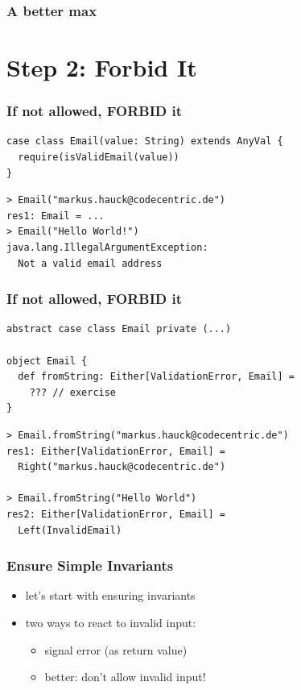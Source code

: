 \documentclass{beamer}
\begin{document}
\begin{frame}
  \frametitle{A better max}
  
\end{frame}

\section{Step 2: Forbid It}

\begin{frame}[fragile]
  \frametitle{If not allowed, FORBID it}
\begin{verbatim}
case class Email(value: String) extends AnyVal {
  require(isValidEmail(value))
}
\end{verbatim}
\begin{verbatim}
> Email("markus.hauck@codecentric.de")
res1: Email = ...
> Email("Hello World!")
java.lang.IllegalArgumentException: 
  Not a valid email address                      
\end{verbatim}
\end{frame}

\begin{frame}
  \frametitle{If not allowed, FORBID it}
\begin{verbatim}
abstract case class Email private (...)

object Email {
  def fromString: Either[ValidationError, Email] = 
    ??? // exercise
}
\end{verbatim}

\begin{verbatim}
> Email.fromString("markus.hauck@codecentric.de")
res1: Either[ValidationError, Email] = 
  Right("markus.hauck@codecentric.de")

> Email.fromString("Hello World")
res2: Either[ValidationError, Email] = 
  Left(InvalidEmail)
\end{verbatim}
\end{frame}

\begin{frame}
  \frametitle{Ensure Simple Invariants}
  \begin{itemize}
  \item let's start with ensuring invariants
  \item two ways to react to invalid input:
    \begin{itemize}
    \item signal error (as return value)
    \item better: don't allow invalid input!
    \end{itemize}
  \end{itemize}
\end{frame}
\end{document}
